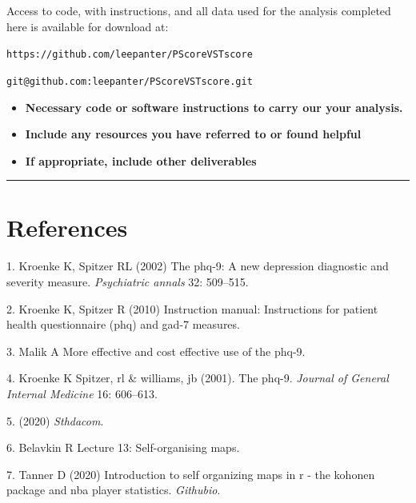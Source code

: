 \documentclass[12pt,]{article}
\providecommand{\tightlist}{%
  \setlength{\itemsep}{0pt}\setlength{\parskip}{0pt}}
\begin{document}
Access to code, with instructions, and all data used for the analysis
completed here is available for download at:

\texttt{https://github.com/leepanter/PScoreVSTscore}

\texttt{git@github.com:leepanter/PScoreVSTscore.git}

\begin{itemize}
\tightlist
\item
  \textbf{Necessary code or software instructions to carry our your analysis.}
\item
  \textbf{Include any resources you have referred to or found helpful}
\item
  \textbf{If appropriate, include other deliverables}
\end{itemize}

\begin{center}\rule{0.5\linewidth}{\linethickness}\end{center}

\hypertarget{references}{%
\section{References}\label{references}}



\hypertarget{refs}{}
\leavevmode\hypertarget{ref-kroenke2002phq}{}%
1. Kroenke K, Spitzer RL (2002) The phq-9: A new depression diagnostic
and severity measure. \emph{Psychiatric annals} 32: 509--515.

\leavevmode\hypertarget{ref-kroenke2010instruction}{}%
2. Kroenke K, Spitzer R (2010) Instruction manual: Instructions for
patient health questionnaire (phq) and gad-7 measures.

\leavevmode\hypertarget{ref-MalikMoreEf}{}%
3. Malik A More effective and cost effective use of the phq-9.

\leavevmode\hypertarget{ref-kroenke16spitzer}{}%
4. Kroenke K Spitzer, rl \& williams, jb (2001). The phq-9.
\emph{Journal of General Internal Medicine} 16: 606--613.

\leavevmode\hypertarget{ref-STHDA_2020}{}%
5. (2020) \emph{Sthdacom}.

\leavevmode\hypertarget{ref-Belavkin}{}%
6. Belavkin R Lecture 13: Self-organising maps.

\leavevmode\hypertarget{ref-Tanner_2020}{}%
7. Tanner D (2020) Introduction to self organizing maps in r - the
kohonen package and nba player statistics. \emph{Githubio}.
\end{document}
